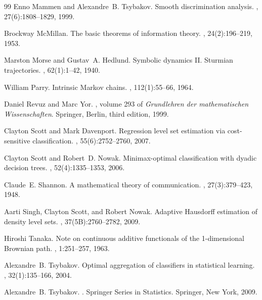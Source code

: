 \begin{thebibliography}{99}
Enno Mammen and Alexandre~B. Tsybakov.
\newblock Smooth discrimination analysis.
, 27(6):1808--1829, 1999.

Brockway McMillan.
\newblock The basic theorems of information theory.
, 24(2):196--219, 1953.

Marston Morse and Gustav~A. Hedlund.
\newblock Symbolic dynamics {II}. {S}turmian trajectories.
, 62(1):1--42, 1940.

William Parry.
\newblock Intrinsic {M}arkov chains.
,
  112(1):55--66, 1964.

Daniel Revuz and Marc Yor.
, volume 293 of
  {\em Grundlehren der mathematischen Wissenschaften}.
\newblock Springer, Berlin, third edition, 1999.

Clayton Scott and Mark Davenport.
\newblock Regression level set estimation via cost-sensitive classification.
, 55(6):2752--2760,
  2007.

Clayton Scott and Robert~D. Nowak.
\newblock Minimax-optimal classification with dyadic decision trees.
, 52(4):1335--1353,
  2006.

Claude~E. Shannon.
\newblock A mathematical theory of communication.
, 27(3):379--423, 1948.

Aarti Singh, Clayton Scott, and Robert Nowak.
\newblock Adaptive {H}ausdorff estimation of density level sets.
, 37(5B):2760--2782, 2009.

Hiroshi Tanaka.
\newblock Note on continuous additive functionals of the 1-dimensional
  {B}rownian path.
, 1:251--257, 1963.

Alexandre~B. Tsybakov.
\newblock Optimal aggregation of classifiers in statistical learning.
, 32(1):135--166, 2004.

Alexandre~B. Tsybakov.
.
\newblock Springer Series in Statistics. Springer, New York, 2009.


\end{thebibliography}
